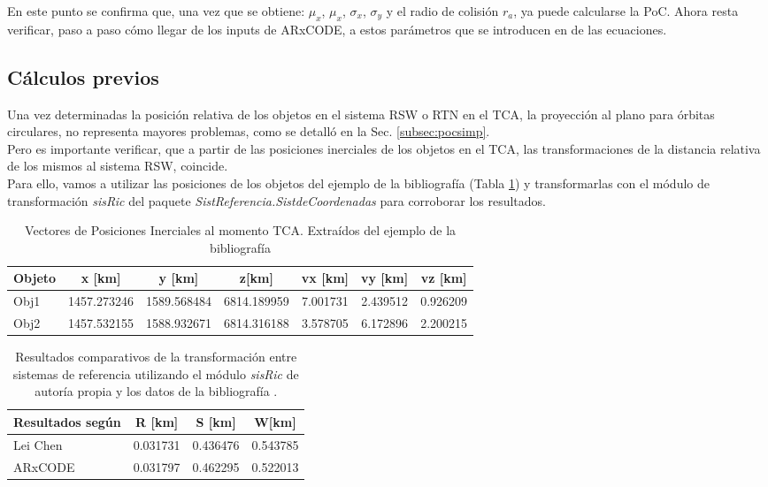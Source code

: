 En este punto se confirma que, una vez que se obtiene: $\mu_{x}$, $\mu_{x}$, $\sigma_{x}$, $\sigma_{y}$ y el radio de colisi\'on $r_{a}$, ya puede calcularse la PoC. 
Ahora resta verificar, paso a paso c\'omo llegar de los inputs de ARxCODE, a estos par\'ametros que se introducen en de las ecuaciones. \\

\subsection*{C\'alculos previos}

Una vez determinadas la posici\'on relativa de los objetos en el sistema RSW o RTN en el TCA, la proyecci\'on al plano para \'orbitas circulares, no representa mayores problemas, como se detall\'o en la Sec. \ref{subsec:pocsimp}.\\

Pero es importante verificar, que a partir de las posiciones inerciales de los objetos en el TCA, las transformaciones de la distancia relativa de los mismos al sistema RSW, coincide.\\
Para ello, vamos a utilizar las posiciones de los objetos del ejemplo de la bibliograf\'ia (Tabla \ref{tab:vectejemplo}) y transformarlas con el m\'odulo de transformaci\'on {\it{sisRic}} del paquete {\it{SistReferencia.SistdeCoordenadas}} para corroborar los resultados.
\\

\begin{table}[!h]
\centering
\begin{tabular}{l|c|c|c|c|c|c}
\hline
Objeto & x [km] & y [km] &z[km] &vx [km] &vy [km] &vz [km]\\
\hline
Obj1 & 1457.273246 &1589.568484&6814.189959&7.001731&2.439512&0.926209\\
\hline
Obj2 & 1457.532155&1588.932671&6814.316188&3.578705&6.172896&2.200215\\
\hline
\end{tabular}
\caption{Vectores de Posiciones Inerciales al momento TCA. Extra\'idos del ejemplo de la bibliograf\'ia \citep{leichen}}
\label{tab:vectejemplo}
\end{table}

\begin{table}[!h]
\large
 \centering
\begin{tabular}{|l|c|c|c|}
\hline
Resultados seg\'un & R [km] & S [km] & W[km] \\
\hline
Lei Chen & 0.031731& 0.436476&0.543785\\
\hline
ARxCODE & 0.031797& 0.462295 &0.522013
\\
\hline
\end{tabular}
\caption{Resultados comparativos de la transformaci\'on entre sistemas de referencia utilizando el m\'odulo {\it{sisRic}} de autor\'ia propia y los datos de la bibliograf\'ia \citep{leichen}.}
\label{tab:rswcomp}
\end{table}

